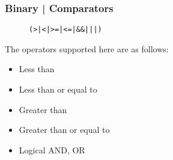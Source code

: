 \documentclass{article}
\begin{document}
\subsubsection{Binary | Comparators}
\begin{flushleft}
\begin{figure}[!htpb]
\centering
\begin{Verbatim}[frame=single]
(>|<|>=|<=|&&|||)
\end{Verbatim}
\end{figure}

The operators supported here are as follows:
\begin{itemize}
\item Less than
\item Less than or equal to
\item Greater than
\item Greater than or equal to
\item Logical AND, OR
\end{itemize}
\end{flushleft}
\end{document}
